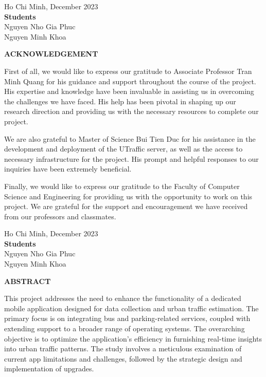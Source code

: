 \documentclass[13pt, a4paper]{article}
\begin{document}
\begin{flushright}
    Ho Chi Minh, December 2023 \\
    \textbf{Students} \\
    Nguyen Nho Gia Phuc \\
    Nguyen Minh Khoa
\end{flushright}


\newpage
\begin{center}
    \Large{\textbf{ACKNOWLEDGEMENT}}
\end{center}

First of all, we would like to express our gratitude to Associate Professor Tran Minh Quang for his guidance and support throughout the course of the project. His expertise and knowledge have been invaluable in assisting us in overcoming the challenges we have faced. His help has been pivotal in shaping up our research direction and providing us with the necessary resources to complete our project. 

We are also grateful to Master of Science Bui Tien Duc for his assistance in the development and deployment of the UTraffic server, as well as the access to necessary infrastructure for the project. His prompt and helpful responses to our inquiries have been extremely beneficial.

Finally, we would like to express our gratitude to the Faculty of Computer Science and Engineering for providing us with the opportunity to work on this project. We are grateful for the support and encouragement we have received from our professors and classmates.

\begin{flushright}
    Ho Chi Minh, December 2023 \\
    \textbf{Students} \\
    Nguyen Nho Gia Phuc \\
    Nguyen Minh Khoa
\end{flushright}

\newpage
\begin{center}
    \Large{\textbf{ABSTRACT}}
\end{center}

This project addresses the need to enhance the functionality of a dedicated mobile application designed for data collection and urban traffic estimation. The primary focus is on integrating bus and parking-related services, coupled with extending support to a broader range of operating systems. The overarching objective is to optimize the application's efficiency in furnishing real-time insights into urban traffic patterns. The study involves a meticulous examination of current app limitations and challenges, followed by the strategic design and implementation of upgrades.
\end{document}
